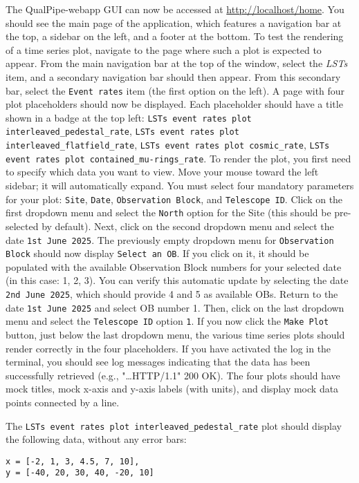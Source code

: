 The QualPipe-webapp GUI can now be accessed at \url{http://localhost/home}.
You should see the main page of the application, which features a navigation bar at the top, a sidebar on the left, and a footer at the bottom.
To test the rendering of a time series plot, navigate to the page where such a plot is expected to appear.
From the main navigation bar at the top of the window, select the \textit{LSTs} item, and a secondary navigation bar should then appear.
From this secondary bar, select the \texttt{Event rates} item (the first option on the left). A page with four plot placeholders should now be displayed.
Each placeholder should have a title shown in a badge at the top left:
\texttt{LSTs event rates plot interleaved\_pedestal\_rate},
\texttt{LSTs event rates plot interleaved\_flatfield\_rate},
\texttt{LSTs event rates plot cosmic\_rate},
\texttt{LSTs event rates plot contained\_mu-rings\_rate}.
To render the plot, you first need to specify which data you want to view. Move your mouse toward the left sidebar; it will automatically expand.
You must select four mandatory parameters for your plot: \texttt{Site}, \texttt{Date}, \texttt{Observation Block}, and \texttt{Telescope ID}.
Click on the first dropdown menu and select the \texttt{North} option for the Site (this should be pre-selected by default).
Next, click on the second dropdown menu and select the date \texttt{1st June 2025}.
The previously empty dropdown menu for \texttt{Observation Block} should now display \texttt{Select an OB}. If you click on it, it should be populated with the available Observation Block numbers for your selected date (in this case: 1, 2, 3).
You can verify this automatic update by selecting the date \texttt{2nd June 2025}, which should provide 4 and 5 as available OBs.
Return to the date \texttt{1st June 2025} and select OB number 1.
Then, click on the last dropdown menu and select the \texttt{Telescope ID} option \texttt{1}.
If you now click the \texttt{Make Plot} button, just below the last dropdown menu, the various time series plots should render correctly in the four placeholders.
If you have activated the log in the terminal, you should see log messages indicating that the data has been successfully retrieved (e.g., "\ldots HTTP/1.1" 200 OK).
The four plots should have mock titles, mock x-axis and y-axis labels (with units), and display mock data points connected by a line.

The \texttt{LSTs event rates plot interleaved\_pedestal\_rate} plot should display the following data, without any error bars:
\begin{verbatim}
x = [-2, 1, 3, 4.5, 7, 10],
y = [-40, 20, 30, 40, -20, 10]
\end{verbatim}

